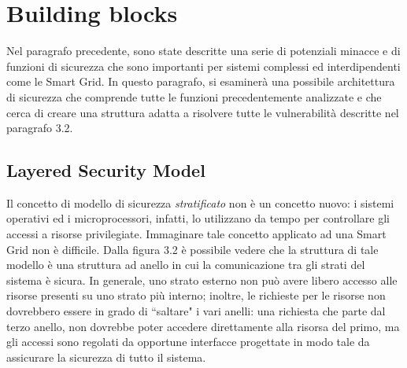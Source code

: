 \section{Building blocks}
Nel paragrafo precedente, sono state descritte una serie di potenziali minacce e di funzioni di sicurezza che sono importanti per sistemi complessi ed interdipendenti come le Smart Grid. \newline In questo paragrafo, si esaminerà una possibile architettura di sicurezza che comprende tutte le funzioni precedentemente analizzate e che cerca di creare una struttura adatta a risolvere tutte le vulnerabilità descritte nel paragrafo 3.2.

\subsection{Layered Security Model}
Il concetto di modello di sicurezza \textit{stratificato} non è un concetto nuovo: i sistemi operativi ed i microprocessori, infatti, lo utilizzano da tempo per controllare gli accessi a  risorse privilegiate. \newline Immaginare tale concetto applicato ad una Smart Grid non è difficile. \newline Dalla figura 3.2 è possibile vedere che la struttura di tale modello è una struttura ad anello in cui la comunicazione tra gli strati del sistema è sicura. In generale, uno strato esterno non può avere libero accesso alle risorse presenti su uno strato più interno; inoltre, le richieste per le risorse non dovrebbero essere in grado di ``saltare" i vari anelli: una richiesta che parte dal terzo anello, non dovrebbe poter accedere direttamente alla risorsa del primo, ma gli accessi sono regolati da opportune interfacce progettate in modo tale da assicurare la sicurezza di tutto il sistema.

\begin{figure}[h]
\end{figure}

